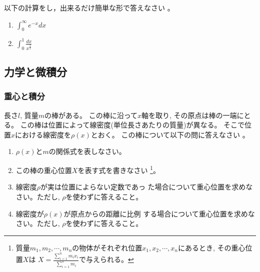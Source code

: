 \documentclass[twocolumn,11pt]{jarticle}
\begin{document}
\question
以下の計算をし，出来るだけ簡単な形で答えなさい
。
\begin{enumerate}
\item\label{eq:int2:e^(-x)}   $\displaystyle\int_0^{\infty}e^{-x}dx$
\item\label{eq:int2:x^(-2/3)}   $\displaystyle\int_0^1\frac{dx}{x^{\frac{2}{3}}}$
\end{enumerate}

\subsection{力学と微積分}

\subsubsection{重心と積分}

\nquestion
長さ$l$, 質量$m$の棒がある。
この棒に沿って$x$軸を取り, その原点は棒の一端にとる。
この棒は位置によって線密度(単位長さあたりの質量)が異なる。
そこで位置$x$における線密度を$\rho(x)$とおく。
この棒について以下の問に答えなさい
。
\begin{enumerate}
\item\label{item:stick-m} $\rho(x)$と$m$の関係式を表しなさい。
\item\label{item:stick-com} この棒の重心位置$X$を表す式を書きなさい
  \footnote{質量$m_1, m_2, \cdots, m_n$の物体がそれぞれ位置$x_1, x_2,
    \cdots, x_n$にあるとき,
    その重心位置$X$は
    $\displaystyle X=\frac{\displaystyle\sum_{i=1}^nm_ix_i}{\displaystyle\sum_{i=1}^nm_i}$で与えられる。
  }。
\item\label{item:stick-com-1} 線密度$\rho$が実は位置によらない定数であっ
  た場合について重心位置を求めなさい。ただし, $\rho$を使わずに答えること。
\item\label{item:stick-com-2} 線密度が$\rho(x)$が原点からの距離に比例
  する場合について重心位置を求めなさい。ただし, $\rho$を使わずに答えること。
\end{enumerate}
\end{document}
